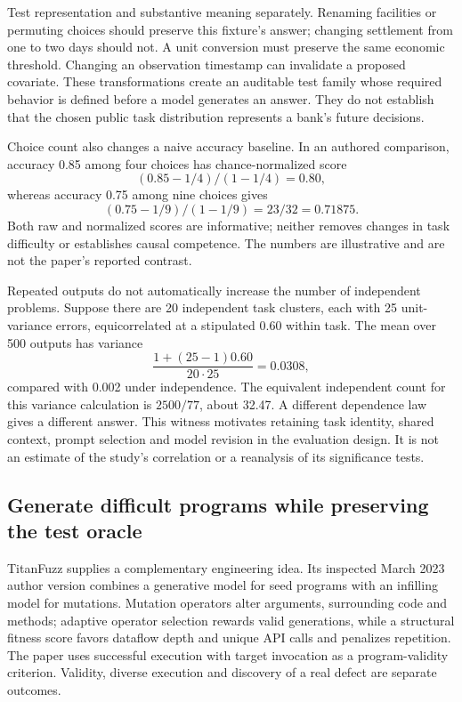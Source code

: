 Test representation and substantive meaning separately. Renaming facilities or permuting choices should preserve this fixture's answer; changing settlement from one to two days should not. A unit conversion must preserve the same economic threshold. Changing an observation timestamp can invalidate a proposed covariate. These transformations create an auditable test family whose required behavior is defined before a model generates an answer. They do not establish that the chosen public task distribution represents a bank's future decisions.\citep{exec24_affordance_fuzzing_reference}

Choice count also changes a naive accuracy baseline. In an authored comparison, accuracy 0.85 among four choices has chance-normalized score
\[
 (0.85-1/4)/(1-1/4)=0.80,
\]
whereas accuracy 0.75 among nine choices gives
\[
 (0.75-1/9)/(1-1/9)=23/32=0.71875.
\]
Both raw and normalized scores are informative; neither removes changes in task difficulty or establishes causal competence. The numbers are illustrative and are not the paper's reported contrast.\citep{exec24_affordance_fuzzing_reference}

Repeated outputs do not automatically increase the number of independent problems. Suppose there are 20 independent task clusters, each with 25 unit-variance errors, equicorrelated at a stipulated 0.60 within task. The mean over 500 outputs has variance
\[
 \frac{1+(25-1)0.60}{20\cdot25}=0.0308,
\]
compared with 0.002 under independence. The equivalent independent count for this variance calculation is $2500/77$, about 32.47. A different dependence law gives a different answer. This witness motivates retaining task identity, shared context, prompt selection and model revision in the evaluation design. It is not an estimate of the study's correlation or a reanalysis of its significance tests.\citep{exec24_affordance_fuzzing_reference}

\subsection{Generate difficult programs while preserving the test oracle}
TitanFuzz supplies a complementary engineering idea. Its inspected March 2023 author version combines a generative model for seed programs with an infilling model for mutations. Mutation operators alter arguments, surrounding code and methods; adaptive operator selection rewards valid generations, while a structural fitness score favors dataflow depth and unique API calls and penalizes repetition. The paper uses successful execution with target invocation as a program-validity criterion. Validity, diverse execution and discovery of a real defect are separate outcomes.\citep{exec24_fuzzing_original}

